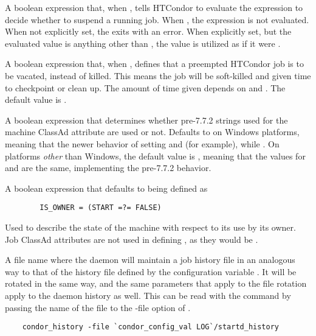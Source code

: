 \begin{description}
\label{param:WantSuspend}
\item[\Macro{WANT\_SUSPEND}]
  A boolean expression that, when ,
  tells HTCondor to evaluate the  expression to decide
  whether to suspend a running job.  When , the 
  expression is not evaluated.
  When not explicitly set, the  exits with an error.
  When explicitly set, but the evaluated value is anything other than
  , the value is utilized as if it were .

\label{param:WantVacate}
\item[\Macro{WANT\_VACATE}]
  A boolean expression that, when , defines that a preempted
  HTCondor job is to be vacated, instead of killed.  This means the
  job will be soft-killed and given time to checkpoint or clean up.
  The amount of time given depends on 
  and .
  The default value is .

\label{param:EnableVersionedOpsys}
\item[\Macro{ENABLE\_VERSIONED\_OPSYS}]
  A boolean expression that determines whether pre-7.7.2 strings used for
  the machine ClassAd attribute  are used or not.
  Defaults to  on Windows platforms, meaning that the newer
  behavior of setting  and 
  (for example), while .
  On platforms \emph{other} than Windows, the default value is ,
  meaning that the values for  and  are the same,
  implementing the pre-7.7.2 behavior.

\label{param:IsOwner}
\item[\Macro{IS\_OWNER}]
  A boolean expression that defaults to being defined as
\begin{verbatim}
        IS_OWNER = (START =?= FALSE)
\end{verbatim}
  Used to describe the state of the machine with respect to its use
  by its owner.
  Job ClassAd attributes are not used in defining ,
  as they would be .

\label{param:StartdHistory}
\item[\Macro{STARTD\_HISTORY}]
  A file name where the  daemon will
  maintain a job history file in an analogous way to that of the 
  history file defined by the configuration variable .
  It will be rotated in the same way,
  and the same parameters that apply to the  file
  rotation apply to the  daemon history as well.
  This can be read with the  command by passing the
  name of the file to the -file option of .
\begin{verbatim}
	condor_history -file `condor_config_val LOG`/startd_history
\end{verbatim}

\end{description}




